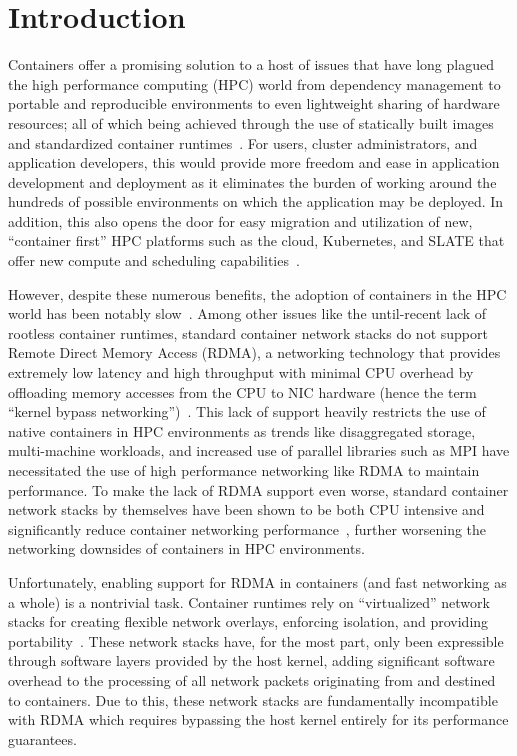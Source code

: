 \documentclass[12pt,titlepage]{article}
\begin{document}
\section{Introduction}
Containers offer a promising solution to a host of issues that have long plagued the high performance computing (HPC) world from dependency management to portable and reproducible environments to even lightweight sharing of hardware resources;
all of which being achieved through the use of statically built images and standardized container runtimes~\cite{containershpc}.
For users, cluster administrators, and application developers, this would provide more freedom and ease in application development and deployment as it eliminates the burden of working around the hundreds of possible environments on which the application may be deployed.
In addition, this also opens the door for easy migration and utilization of new, ``container first'' HPC platforms such as the cloud, Kubernetes, and SLATE that offer new compute and scheduling capabilities~\cite{slatepaper}.

However, despite these numerous benefits, the adoption of containers in the HPC world has been notably slow~\cite{hpcappscontainers}.
Among other issues like the until-recent lack of rootless container runtimes, standard container network stacks do not support Remote Direct Memory Access (RDMA), a networking technology that provides extremely low latency and high throughput with minimal CPU overhead by offloading memory accesses from the CPU to NIC hardware (hence the term ``kernel bypass networking'')~\cite{mellanoxrocerdmabenefits}.
This lack of support heavily restricts the use of native containers in HPC environments as trends like disaggregated storage, multi-machine workloads, and increased use of parallel libraries such as MPI have necessitated the use of high performance networking like RDMA to maintain performance.
To make the lack of RDMA support even worse, standard container network stacks by themselves have been shown to be both CPU intensive and significantly reduce container networking performance~\cite{abbasi2019performance,xavier2013performance,lee2018impact,zhao2017performance,kapovcius2020performance}, further worsening the networking downsides of containers in HPC environments.

Unfortunately, enabling support for RDMA in containers (and fast networking as a whole) is a nontrivial task.
Container runtimes rely on ``virtualized'' network stacks for creating flexible network overlays, enforcing isolation, and providing portability~\cite{xavier2013performance}.
These network stacks have, for the most part, only been expressible through software layers provided by the host kernel, adding significant software overhead to the processing of all network packets originating from and destined to containers.
Due to this, these network stacks are fundamentally incompatible with RDMA which requires bypassing the host kernel entirely for its performance guarantees.
\end{document}
